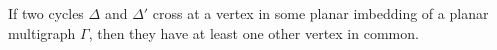 If two cycles $\Delta$ and $\Delta'$ cross at a vertex in some planar imbedding of a planar multigraph $\Gamma$, then they have at least one other vertex in common.
